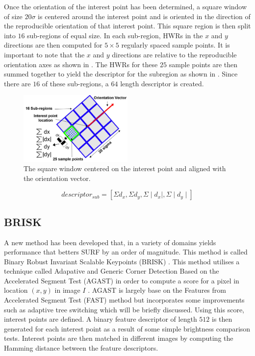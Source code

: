 \documentclass{article}
\begin{document}
Once the orientation of the interest point has been determined, a square window of size $20\sigma$ is centered around the interest point and is oriented in the direction of the reproducible orientation of that interest point. This square region is then split into $16$ sub-regions of equal size. In each sub-region, HWRs in the $x$ and $y$ directions are then computed for $5 \times 5$ regularly spaced sample points. It is important to note that the $x$ and $y$ directions are relative to the reproducible orientation axes as shown in  \cite{Evans2009}. The HWRs for these $25$ sample points are then summed together to yield the descriptor for the subregion as shown in . Since there are $16$ of these sub-regions, a $64$ length descriptor is created.\\

\begin{figure}[h!] 
  \centering
    \includegraphics[width=0.5\textwidth]{../Drawings/methods/SURF2D_Descriptor.jpg}
    \caption{The square window centered on the interest point and aligned with the orientation vector.}
    \label{fig:reproducibleAxes}
\end{figure}

\begin{equation}
descriptor_{sub} = [\Sigma d_x, \Sigma d_y,  \Sigma \mid d_x \mid , \Sigma \mid d_y \mid] 
\label{eqn:descriptorSub}
\end{equation} 



\subsection{BRISK}
\label{sec:brisk}
A new method has been developed that, in a variety of domains yields performance that betters SURF by an order of magnitude. This method is called Binary Robust Invariant Scalable Keypoints (BRISK) \cite{Leutenegger2011}. This method utilises a technique called Adapative and Generic Corner Detection Based on the Accelerated Segment Test (AGAST) in order to compute a score for a pixel in location $(x,y)$ in image $I$ \cite{Mair2010}. AGAST is largely base on the Features from Accelerated Segment Test (FAST) \cite{Rosten2006} method but incorporates some improvements such as adaptive tree switching which will be briefly discussed. Using this score, interest points are defined. A binary feature descriptor of length $512$ is then generated for each interest point as a result of some simple brightness comparison tests. Interest points are then matched in different images by computing the Hamming distance between the feature descriptors. \\
\end{document}
